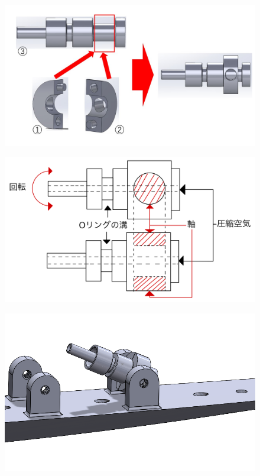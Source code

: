 \begin{figure}[htbp]
  \begin{minipage}{0.45\hsize}
    \centering  
    \includegraphics[scale=0.2]{image/tanbu_parts.jpg}
    \label{fig:tanbu_parts}
  \end{minipage}
  \begin{minipage}{0.49\hsize}
    \centering
    \includegraphics[scale=0.085]{image/MPA_irast.jpg}
    \label{fig:tanbu_moshikizu}
  \end{minipage}
  \begin{minipage}{0.49\hsize}
    \centering
    \includegraphics[scale=0.2]{image/asenburi_tanbu.png}

\end{minipage}
\end{figure}
